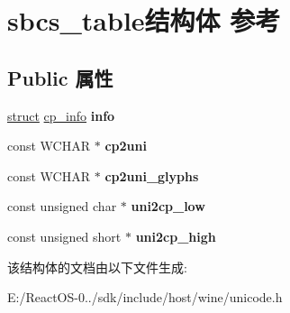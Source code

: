 \hypertarget{structsbcs__table}{}\section{sbcs\+\_\+table结构体 参考}
\label{structsbcs__table}
\subsection*{Public 属性}
\begin{DoxyCompactItemize}
\item 
\mbox{\label{structsbcs__table_a94e5905e61f43649717cd5a16d8c493f}} 
\hyperlink{interfacestruct}{struct} \hyperlink{structcp__info}{cp\+\_\+info} {\bfseries info}
\item 
\mbox{\label{structsbcs__table_afe4fdd40d6ca8b38b6cfa9c3cf4e5385}} 
const W\+C\+H\+AR $\ast$ {\bfseries cp2uni}
\item 
\mbox{\label{structsbcs__table_a5004f3659f70e2682ed027607738dc93}} 
const W\+C\+H\+AR $\ast$ {\bfseries cp2uni\+\_\+glyphs}
\item 
\mbox{\label{structsbcs__table_a89625d21510760f04d45d05bbd0c9e39}} 
const unsigned char $\ast$ {\bfseries uni2cp\+\_\+low}
\item 
\mbox{\label{structsbcs__table_a66640ce4d213a2139ed57dccff7da2e5}} 
const unsigned short $\ast$ {\bfseries uni2cp\+\_\+high}
\end{DoxyCompactItemize}


该结构体的文档由以下文件生成\+:\begin{DoxyCompactItemize}
\item 
E\+:/\+React\+O\+S-\/0../sdk/include/host/wine/unicode.\+h\end{DoxyCompactItemize}
